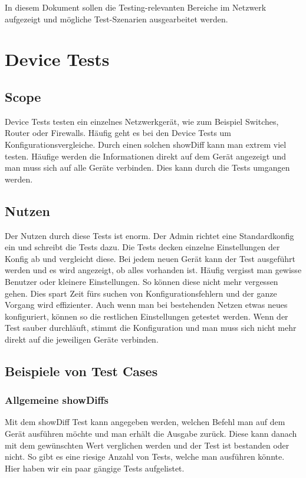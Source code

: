 \documentclass[a4,12pt]{scrartcl}
\begin{document}
\noindent In diesem Dokument sollen die Testing-relevanten Bereiche im Netzwerk aufgezeigt und mögliche Test-Szenarien ausgearbeitet werden.
\newpage
\section{Device Tests}
\subsection{Scope}
Device Tests testen ein einzelnes Netzwerkgerät, wie zum Beispiel Switches, Router oder Firewalls. Häufig geht es bei den Device Tests um Konfigurationsvergleiche. Durch einen solchen showDiff kann man extrem viel testen.\newline\newline
Häufige werden die Informationen direkt auf dem Gerät angezeigt und man muss sich auf alle Geräte verbinden. Dies kann durch die Tests umgangen werden. 
\subsection{Nutzen}
Der Nutzen durch diese Tests ist enorm. Der Admin richtet eine Standardkonfig ein und schreibt die Tests dazu. Die Tests decken einzelne Einstellungen der Konfig ab und vergleicht diese. Bei jedem neuen Gerät kann der Test ausgeführt werden und es wird angezeigt, ob alles vorhanden ist. Häufig vergisst man gewisse Benutzer oder kleinere Einstellungen. So können diese nicht mehr vergessen gehen.\newline\newline
Dies spart Zeit fürs suchen von Konfigurationsfehlern und der ganze Vorgang wird effizienter. Auch wenn man bei bestehenden Netzen etwas neues konfiguriert, können so die restlichen Einstellungen getestet werden. Wenn der Test sauber durchläuft, stimmt die Konfiguration und man muss sich nicht mehr direkt auf die jeweiligen Geräte verbinden. 
\subsection{Beispiele von Test Cases}
\subsubsection{Allgemeine showDiffs}
Mit dem showDiff Test kann angegeben werden, welchen Befehl man auf dem Gerät ausführen möchte und man erhält die Ausgabe zurück. Diese kann danach mit dem gewünschten Wert verglichen werden und der Test ist bestanden oder nicht.
So gibt es eine riesige Anzahl von Tests, welche man ausführen könnte. Hier haben wir ein paar gängige Tests aufgelistet.
\end{document}
